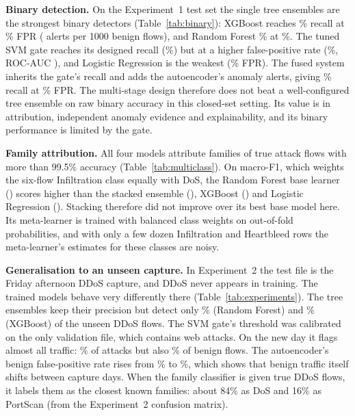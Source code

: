 \textbf{Binary detection.} On the Experiment~1 test set the single tree ensembles are the strongest binary detectors (Table~\ref{tab:binary}): XGBoost reaches \EoneXgbRecall\% recall at \EoneXgbFpr\% FPR (\EoneXgbAlerts{} alerts per 1000 benign flows), and Random Forest \EoneRfRecall\% at \EoneRfFpr\%. The tuned SVM gate reaches its designed recall (\EoneGateRecall\%) but at a higher false-positive rate (\EoneGateFpr\%, ROC-AUC \EoneGateAuc), and Logistic Regression is the weakest (\EoneLrFpr\% FPR). The fused system inherits the gate's recall and adds the autoencoder's anomaly alerts, giving \EoneFusionRecall\% recall at \EoneFusionFpr\% FPR. The multi-stage design therefore does not beat a well-configured tree ensemble on raw binary accuracy in this closed-set setting. Its value is in attribution, independent anomaly evidence and explainability, and its binary performance is limited by the gate.

\textbf{Family attribution.} All four models attribute families of true attack flows with more than 99.5\% accuracy (Table~\ref{tab:multiclass}). On macro-F1, which weights the six-flow Infiltration class equally with DoS, the Random Forest base learner (\EoneRfMacroFone) scores higher than the stacked ensemble (\EoneStackMacroFone), XGBoost (\EoneXgbMacroFone) and Logistic Regression (\EoneLrMacroFone). Stacking therefore did not improve over its best base model here. Its meta-learner is trained with balanced class weights on out-of-fold probabilities, and with only a few dozen Infiltration and Heartbleed rows the meta-learner's estimates for these classes are noisy.

\textbf{Generalisation to an unseen capture.} In Experiment~2 the test file is the Friday afternoon DDoS capture, and DDoS never appears in training. The trained models behave very differently there (Table~\ref{tab:experiments}). The tree ensembles keep their precision but detect only \EtwoRfRecall\% (Random Forest) and \EtwoXgbRecall\% (XGBoost) of the unseen DDoS flows. The SVM gate's threshold was calibrated on the only validation file, which contains web attacks. On the new day it flags almost all traffic: \EtwoGateRecall\% of attacks but also \EtwoGateFpr\% of benign flows. The autoencoder's benign false-positive rate rises from \EoneAeFpr\% to \EtwoAeFpr\%, which shows that benign traffic itself shifts between capture days. When the family classifier is given true DDoS flows, it labels them as the closest known families: about 84\% as DoS and 16\% as PortScan (from the Experiment~2 confusion matrix).

